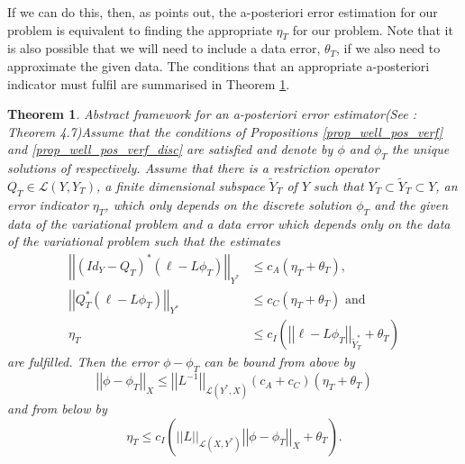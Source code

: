 \documentclass[12pt,a4paper]{article}
\newtheorem{theorem}{Theorem}[section]
\theoremstyle{definition}
\begin{document}
If we can do this, then, as \cite{verfurth2013posteriori} points out, the a-posteriori error estimation for our problem is equivalent to finding the appropriate $\eta_T$ for our problem.  Note that it is also possible that we will need to include a data error, $\theta_T$, if we also need to approximate the given data.  The conditions that an appropriate a-posteriori indicator must fulfil are summarised in Theorem \ref{verf_thm_apost_bounds}.
\begin{theorem}{Abstract framework for an a-posteriori error estimator}(See \cite[\S4.1.4]{verfurth2013posteriori}: Theorem 4.7)\label{verf_thm_apost_bounds}
	Assume that the conditions of Propositions \ref{prop_well_pos_verf} and \ref{prop_well_pos_verf_disc} are satisfied and denote by $\phi$ and $\phi_T$ the unique solutions of respectively. Assume that there is a restriction operator $Q_T\in \mathcal{L}\left(Y,Y_T\right)$, a finite dimensional subspace $\widetilde{Y}_T$ of $Y$ such that $Y_T\subset\widetilde{Y}_T\subset Y$, an error indicator $\eta_T$, which only depends on the discrete solution $\phi_T$ and the given data of the variational problem and a data error which depends only on the data of the variational problem such that the estimates
	\begin{equation}\nonumber
	\begin{aligned}
	\left|\left|\left(Id_Y-Q_T\right)^*\left(\ell -L\phi_T\right)\right|\right|_{Y^*}&\leq c_A \left(\eta_T + \theta_T\right),\\
	\left|\left|Q_T^*\left(\ell -L\phi_T\right)\right|\right|_{Y^*}&\leq c_C\left(\eta_T+\theta_T\right)\text{ and}\\
	\eta_T &\leq c_I\left(\left|\left|\ell - L\phi_T\right|\right|_{\widetilde{Y}^*_T}+ \theta_T\right)
	\end{aligned}
	\end{equation}
	are fulfilled.  Then the error $\phi-\phi_T$ can be bound from above by
	\begin{equation}\nonumber
	\left|\left|\phi-\phi_T\right|\right|_X\leq\left|\left|L^{-1}\right|\right|_{\mathcal{L}\left(Y^*,X\right)}\left(c_A+c_C\right)\left(\eta_T+\theta_T\right)
	\end{equation}
	and from below by 
	\begin{equation}\nonumber
	\eta_T\leq c_I\left(\left|\left|L\right|\right|_{\mathcal{L}\left(X,Y^*\right)}\left|\left|\phi-\phi_T\right|\right|_X+\theta_T\right).
	\end{equation}
\end{theorem}
\end{document}
